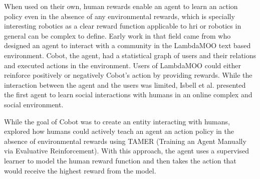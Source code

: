 When used on their own, human rewards enable an agent to learn an action policy even in the absence of any environmental rewards, which is specially interesting robotics as a clear reward function applicable to \gls{hri} or robotics in general can be complex to define. Early work in that field came from \cite{isbell2006cobot} who designed an agent to interact with a community in the LambdaMOO text based environment. Cobot, the agent, had a statistical graph of users and their relations and executed actions in the environment. Users of LambdaMOO could either reinforce positively or negatively Cobot's action by providing rewards. While the interaction between the agent and the users was limited, Isbell et al. presented the first agent to learn social interactions with humans in an online complex and social environment. 

While the goal of Cobot was to create an entity interacting with humans, \cite{knox2009interactively} explored how humans could actively teach an agent an action policy in the absence of environmental rewards using TAMER (Training an Agent Manually via Evaluative Reinforcement). With this approach, the agent uses a supervised learner to model the human reward function and then takes the action that would receive the highest reward from the model. 

